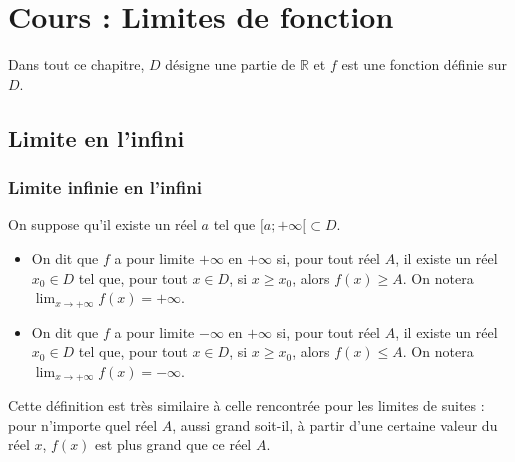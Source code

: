 \documentclass[11pt,fleqn, openany]{book} %
\begin{document}



\chapter{Cours : Limites de fonction}


Dans tout ce chapitre, $D$ désigne une partie de $\mathbb{R}$ et $f$ est une fonction définie sur $D$.


\section{Limite en l'infini}

\subsection{Limite infinie en l'infini}

\begin{definition}On suppose qu'il existe un réel $a$ tel que $[a;+\infty [ \subset D$.
\begin{itemize}
\item On dit que $f$ a pour limite $+\infty$ en $+\infty$ si, pour tout réel $A$, il existe un réel $x_0 \in D$ tel que, pour tout $x \in D$,  si $x  \geqslant x_0$, alors $f(x) \geqslant A$. On notera $\displaystyle \lim_{x \to +\infty} f(x)=+\infty$.
\item On dit que $f$ a pour limite $-\infty$ en $+\infty$ si, pour tout réel $A$, il existe un réel $x_0 \in D$ tel que, pour tout $x \in D$, si $x  \geqslant x_0$, alors $f(x) \leqslant A$. On notera $\displaystyle \lim_{x \to +\infty} f(x)=-\infty$.\end{itemize}\end{definition}

Cette définition est très similaire à celle rencontrée pour les limites de suites : pour n'importe quel réel $A$, aussi grand soit-il, à partir d'une certaine valeur du réel $x$, $f(x)$ est plus grand que ce réel $A$.
\end{document}

